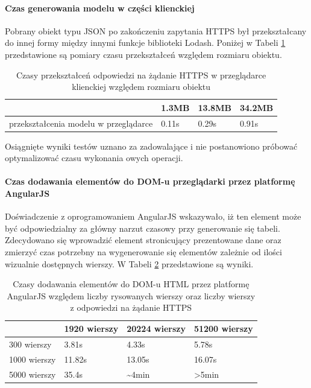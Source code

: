\documentclass[a4paper,12pt,twoside]{article}
\begin{document}
\paragraph{Czas generowania modelu w części klienckiej} Pobrany obiekt typu JSON
po zakończeniu zapytania HTTPS był przekształcany do innej formy między innymi
funkcje biblioteki Lodash. Poniżej w Tabeli \ref{table:lodashTime} przedstawione są pomiary czasu przekształceń względem rozmiaru obiektu.

\begin{table} [H]
\begin{tabular}{| p{3cm} | p{3cm} | p{3cm} | p{3cm}|}
\hline
& 1.3MB&13.8MB& 34.2MB\\
\hline
przekształcenia modelu w przeglądarce& 0.11s & 0.29s& 0.91s\\ \hline
\end{tabular}
\caption{Czasy przekształceń odpowiedzi na żądanie HTTPS w przeglądarce klienckiej względem rozmiaru obiektu}
\label{table:lodashTime}
\end{table}
Osiągnięte wyniki testów uznano za zadowalające i nie postanowiono
próbować optymalizować czasu wykonania owych operacji.

\paragraph{Czas dodawania elementów do DOM-u przeglądarki przez platformę AngularJS}
Doświadczenie z oprogramowaniem AngularJS wskazywało, iż ten element może być odpowiedzialny za główny narzut czasowy przy generowanie się tabeli.
Zdecydowano się wprowadzić element stronicujący prezentowane dane oraz
zmierzyć czas potrzebny na wygenerowanie się elementów zależnie od ilości
wizualnie dostępnych wierszy. W Tabeli \ref{table:tableRender} przedstawione są
wyniki.

\begin{table} [H]
\begin{tabular}{| p{3cm} | p{3cm} | p{3cm} | p{3cm}|}
\hline
& 1920 wierszy & 20224 wierszy & 51200 wierszy\\
\hline
300 wierszy& 3.81s & 4.33s& 5.78s\\ \hline
1000 wierszy& 11.82s & 13.05s& 16.07s\\ \hline
5000 wierszy& 35.4s & \textasciitilde 4min& >5min\\ \hline
\end{tabular}
\caption{Czasy dodawania elementów do DOM-u HTML przez platformę AngularJS względem liczby rysowanych wierszy oraz liczby wierszy z odpowiedzi na żądanie HTTPS}
\label{table:tableRender}
\end{table}
\newpage
\end{document}

